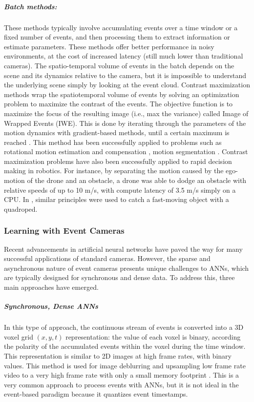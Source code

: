 \documentclass{article}
\begin{document}
\subparagraph{Batch methods:} These methods typically involve accumulating events over a time window or a fixed number of events, and then processing them to extract information or estimate parameters. These methods offer better performance in noisy environments, at the cost of increased latency (still much lower than traditional cameras). The spatio-temporal volume of events in the batch depends on the scene and its dynamics relative to the camera, but it is impossible to understand the underlying scene simply by looking at the event cloud. Contrast maximization methods wrap the spatiotemporal volume of events by solving an optimization problem to maximize the contrast of the events. The objective function is to maximize the focus of the resulting image (i.e., max the variance) called Image of Wrapped Events (IWE). This is done by iterating through the parameters of the motion dynamics with gradient-based methods, until a certain maximum is reached \cite{gallegoUnifyingContrastMaximization2018a, gallegoEventbasedVisionSurvey2022, gallegoFocusAllYou2019}. This method has been successfully applied to problems such as rotational motion estimation and compensation \cite{gallegoAccurateAngularVelocity2017,xingEROAMEventbasedCamera2024}, motion segmentation \cite{stoffregenEventBasedMotionSegmentation2019}. Contrast maximization problems have also been successfully applied to rapid decision making in robotics. For instance, by separating the motion caused by the ego-motion of the drone and an obstacle, a drone was able to dodge an obstacle with relative speeds of up to 10 m/s, with compute latency of 3.5 m/s simply on a CPU. In \cite{forraiEventbasedAgileObject2023}, similar principles were used to catch a fast-moving object with a quadroped.

\subsubsection{Learning with Event Cameras} Recent advancements in artificial neural networks have paved the way for many successful applications of standard cameras. However, the sparse and asynchronous nature of event cameras presents unique challenges to ANNs, which are typically designed for synchronous and dense data. To address this, three main approaches have emerged.

\subparagraph{Synchronous, Dense ANNs} In this type of approach, the continuous stream of events is converted into a 3D voxel grid $(x,y,t)$ representation: the value of each voxel is binary, according the polarity of the accumulated events within the voxel during the time window. This representation is similar to 2D images at high frame rates, with binary values. This method is used for image deblurring and upsampling low frame rate video to a very high frame rate with only a small memory footprint \cite{tulyakovTimeLensEventbasedVideo2021}. This is a very common approach to process events with ANNs, but it is not ideal in the event-based paradigm because it quantizes event timestamps. 
\end{document}
